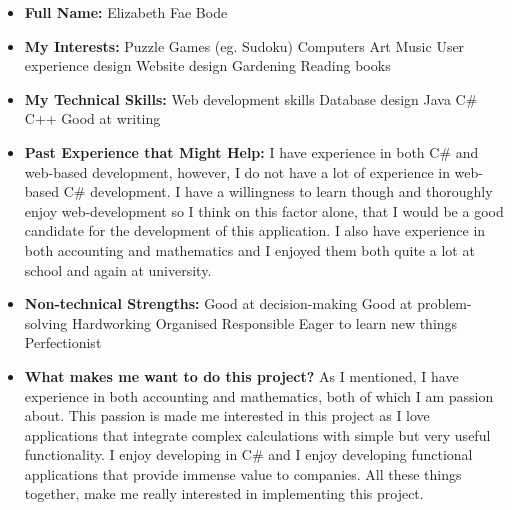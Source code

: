 \documentclass{article}
\begin{document}
	\begin{itemize}
		\item \textbf{Full Name:} Elizabeth Fae Bode
		\item \textbf{My Interests:}
		\subitem Puzzle Games (eg. Sudoku)
		\subitem Computers
		\subitem Art
		\subitem Music
		\subitem User experience design
		\subitem Website design
		\subitem Gardening
		\subitem Reading books
		
		\item \textbf{My Technical Skills:}
		\subitem Web development skills
		\subitem Database design
		\subitem Java
		\subitem C\#
		\subitem C++
		\subitem Good at writing
		
		\item \textbf{Past Experience that Might Help:} \newline
		I have experience in both C\# and web-based development, however, I do not have a lot of experience in web-based C\# development. I have a willingness to learn though and thoroughly enjoy web-development so I think on this factor alone, that I would be a good candidate for the development of this application. I also have experience in both accounting and mathematics and I enjoyed them both quite a lot at school and again at university.
		
		\item \textbf{Non-technical Strengths:}
		\subitem Good at decision-making
		\subitem Good at problem-solving
		\subitem Hardworking
		\subitem Organised
		\subitem Responsible
		\subitem Eager to learn new things
		\subitem Perfectionist
		
		\item \textbf{What makes me want to do this project?} \newline
		As I mentioned, I have experience in both accounting and mathematics, both of which I am passion about. This passion is made me interested in this project as I love applications that integrate complex calculations with simple but very useful functionality. I enjoy developing in C\# and I enjoy developing functional applications that provide immense value to companies. All these things together, make me really interested in implementing this project.
	\end{itemize}
\end{document}
